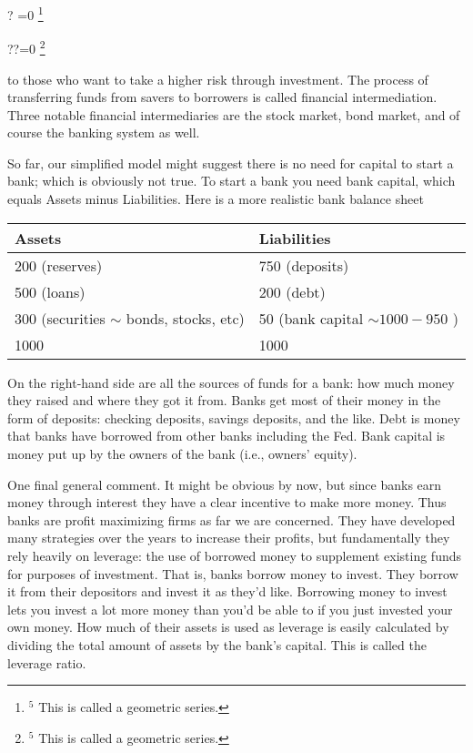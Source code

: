 \documentclass[10pt]{article}
\let\svthefootnote\thefootnote
\newcommand\blfootnotetext[1]{%
  \let\thefootnote\relax\footnote{#1}%
  \addtocounter{footnote}{-1}%
  \let\thefootnote\svthefootnote%
}
\let\svfootnotetext\footnotetext
\renewcommand\footnotetext[2][?]{%
  \if\relax#1\relax%
    \ifnum\value{footnote}=0\blfootnotetext{#2}\else\svfootnotetext{#2}\fi%
  \else%
    \if?#1\ifnum\value{footnote}=0\blfootnotetext{#2}\else\svfootnotetext{#2}\fi%
    \else\svfootnotetext[#1]{#2}\fi%
  \fi
}
\begin{document}
to those who want to take a higher risk through investment. The process of transferring funds from savers to borrowers is called financial intermediation. Three notable financial intermediaries are the stock market, bond market, and of course the banking system as well.

So far, our simplified model might suggest there is no need for capital to start a bank; which is obviously not true. To start a bank you need bank capital, which equals Assets minus Liabilities. Here is a more realistic bank balance sheet

\begin{center}
\begin{tabular}{|l|l|}
\hline
Assets & Liabilities \\
\hline
200 (reserves) & 750 (deposits) \\
\hline
500 (loans) & 200 (debt) \\
\hline
300 (securities $\sim$ bonds, stocks, etc) & 50 (bank capital $\sim 1000-950$ ) \\
\hline
1000 & 1000 \\
\hline
\end{tabular}
\end{center}

On the right-hand side are all the sources of funds for a bank: how much money they raised and where they got it from. Banks get most of their money in the form of deposits: checking deposits, savings deposits, and the like. Debt is money that banks have borrowed from other banks including the Fed. Bank capital is money put up by the owners of the bank (i.e., owners' equity).

One final general comment. It might be obvious by now, but since banks earn money through interest they have a clear incentive to make more money. Thus banks are profit maximizing firms as far we are concerned. They have developed many strategies over the years to increase their profits, but fundamentally they rely heavily on leverage: the use of borrowed money to supplement existing funds for purposes of investment. That is, banks borrow money to invest. They borrow it from their depositors and invest it as they'd like. Borrowing money to invest lets you invest a lot more money than you'd be able to if you just invested your own money. How much of their assets is used as leverage is easily calculated by dividing the total amount of assets by the bank's capital. This is called the leverage ratio.
\end{document}
